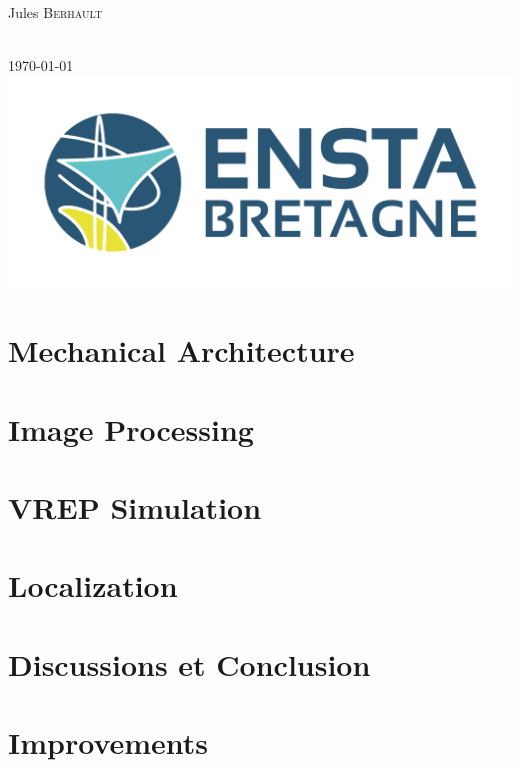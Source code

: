 \documentclass[12pt]{article}
\begin{document}
\begin{titlepage}
\begin{minipage}{0.4\textwidth}
        \begin{flushleft} \large
            Jules \textsc{Berhault}\\  %
            \end{flushleft}
\end{minipage}\\[1cm]
{\large \today}\\[1cm] %
\includegraphics{ENSTA1246-524.png}%
\vfill %

\end{titlepage}

\tableofcontents          %
\listoffigures
\listoftables
\newpage










\section{Mechanical Architecture}


\section{Image Processing}


\section{VREP Simulation}


\section{Localization}




\section{Discussions et Conclusion}


\section{Improvements}




\end{document}
